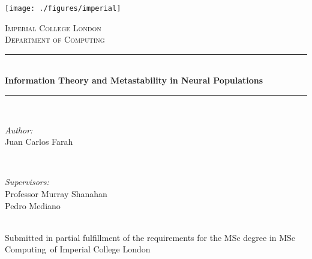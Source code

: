 \documentclass[a4paper,11pt]{article}
\newcommand{\reporttitle}{Information Theory and Metastability in Neural Populations}
\newcommand{\reportauthor}{Juan Carlos Farah}
\newcommand{\supervisor}{Professor Murray Shanahan\\Pedro Mediano}
\newcommand{\degreetype}{MSc Computing}
\begin{document}
\newcommand{\HRule}{\rule{\linewidth}{0.5mm}}


\texttt{[image: ./figures/imperial]}\\[0.5cm]

\begin{center}


\textsc{\Large Imperial College London}\\[0.5cm]
\textsc{\large Department of Computing}\\[0.5cm]


\HRule \\[0.4cm]
{ \huge \bfseries \reporttitle}\\
\HRule \\[1.5cm]


\begin{minipage}{0.4\textwidth}
\begin{flushleft} \large
\emph{Author:}\\
\reportauthor
\end{flushleft}
\end{minipage}
~
\begin{minipage}{0.4\textwidth}
\begin{flushright} \large
\emph{Supervisors:} \\
\supervisor
\end{flushright}
\end{minipage}\\[4cm]


\vfill %
Submitted in partial fulfillment of the requirements for the MSc degree in
\degreetype~of Imperial College London\\[0.5cm]

\makeatletter
\@date
\makeatother

\end{center}
\end{document}
